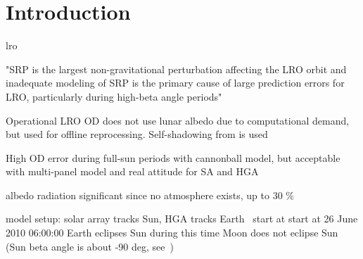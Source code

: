 \section{Introduction}
\gls{lro}

"SRP is the largest non-gravitational perturbation affecting the LRO orbit and inadequate modeling of SRP is the primary cause of large prediction errors for LRO, particularly during high-beta angle periods"~\cite{Slojkowski2015}

Operational LRO OD does not use lunar albedo due to computational demand, but used for offline reprocessing. Self-shadowing from \citeauthor{Mazarico2009} is used~\cite{Nicholson2010}

High OD error during full-sun periods with cannonball model, but acceptable with multi-panel model and real attitude for SA and HGA~\cite[]{Slojkowski2014}

albedo radiation significant since no atmosphere exists, up to 30 \%~\cite{Floberghagen1999}

model setup:
solar array tracks Sun, HGA tracks Earth~\cite{Tooley2010}
start at start at 26 June 2010 06:00:00
Earth eclipses Sun during this time
Moon does not eclipse Sun (Sun beta angle is about -90 deg, see~\cite{Tooley2010})
